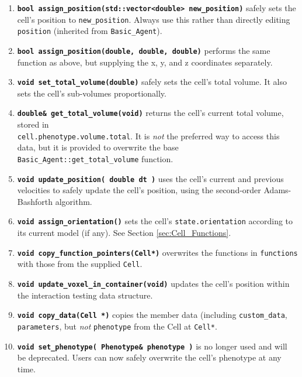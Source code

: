 \documentclass[12pt]{article}
\renewcommand{\v}{\verb}
\newcommand{\smallcode}[1]{\textbf{\texttt{#1}}}
\begin{document}
\begin{enumerate}
\item 
\smallcode{bool assign\_position(std::vector<double> new\_position)} 
safely sets the cell's position to 
\v|new_position|. Always use this rather than directly editing 
\v|position| (inherited from \v|Basic_Agent|).

\item 
\smallcode{bool assign\_position(double, double, double)} performs 
the same function as above, but supplying the x, y, and z coordinates 
separately. 

\item 
\smallcode{void set\_total\_volume(double)} safely sets the cell's total volume. 
It also sets the cell's sub-volumes proportionally. 

\item 
\smallcode{double\& get\_total\_volume(void)} returns the cell's 
current total volume, stored in \\
\v|cell.phenotype.volume.total|. It is 
\emph{not} the preferred way to access this data, but it is provided to 
overwrite the base \v|Basic_Agent::get_total_volume| function. 

\item 
\smallcode{void update\_position( double dt )} uses the cell's current 
and previous velocities to safely update the cell's position, using 
the second-order Adams-Bashforth algorithm. 

\item 
\smallcode{void assign\_orientation()} sets the cell's 
\v|state.orientation| according to its current model (if any). 
See Section \ref{sec:Cell_Functions}.  

\item 
\smallcode{void copy\_function\_pointers(Cell*)} overwrites 
the functions in \v|functions| with those from the 
supplied \v|Cell|. 

\item 
\smallcode{void update\_voxel\_in\_container(void)} updates the 
cell's position within the interaction testing data structure. 

\item 
\smallcode{void copy\_data(Cell *)} copies the member data 
(including \v|custom_data|, \v|parameters|, but \emph{not} \v|phenotype| 
from the Cell at \v|Cell*|. 

\item 
\smallcode{void set\_phenotype( Phenotype\& phenotype )} is no longer used 
and will be deprecated. Users can now safely overwrite the cell's phenotype 
at any time. 


\end{enumerate}
\end{document}
